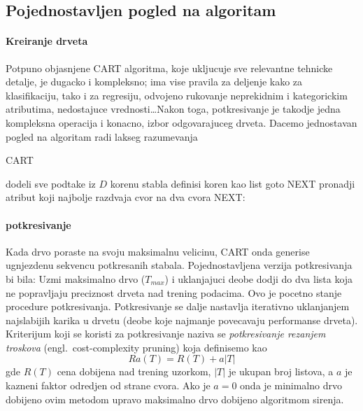 \documentclass[a4paper]{article}
\begin{document}
\subsection{Pojednostavljen pogled na algoritam}

\paragraph{Kreiranje drveta} Potpuno objasnjene CART algoritma, koje ukljucuje sve relevantne
tehnicke detalje, je dugacko i kompleksno; ima vise pravila za deljenje kako za klasifikaciju, tako
i za regresiju, odvojeno rukovanje neprekidnim i kategorickim atributima, nedostajuce
vrednosti\ldots Nakon toga, potkresivanje je takodje jedna kompleksna operacija i konacno, izbor
odgovarajuceg drveta. Dacemo jednostavan pogled na algoritam radi lakseg razumevanja

\begin{algorithm}[H]
    \caption{CART}\label{code:cart}
    \begin{algorithmic}[1]
            \State dodeli sve podtake iz \(D\) korenu stabla
            \State definisi koren kao list
                \State goto NEXT
                \EndIf
                \State pronadji atribut koji najbolje razdvaja cvor na dva cvora
                \State NEXT:
            \EndFor
\EndProcedure
\end{algorithmic}
\end{algorithm}

\paragraph{potkresivanje} Kada drvo poraste na svoju maksimalnu velicinu, CART onda generise
ugnjezdenu sekvencu potkresanih stabala. Pojednostavljena verzija potkresivanja bi bila: Uzmi
maksimalno drvo (\(T_{max}\)) i uklanjajuci deobe dodji do dva lista koja ne popravljaju preciznost
drveta nad trening podacima. Ovo je pocetno stanje procedure potkresivanja. Potkresivanje se dalje
nastavlja iterativno uklanjanjem najslabijih karika u drvetu (deobe koje najmanje povecavaju
performanse drveta). Kriterijum koji se koristi za potkresivanje naziva se \emph{potkresivanje
rezanjem troskova} (engl.\ cost-complexity pruning) koja definisemo kao
\begin{equation}\label{eq:cost-complexity-pruning}
    Ra(T) = R(T) + a|T|
\end{equation}
gde \(R(T)\) cena dobijena nad trening uzorkom, \(|T|\) je ukupan broj listova, a \(a\) je kazneni
faktor odredjen od strane cvora. Ako je \(a = 0\) onda je minimalno drvo dobijeno ovim metodom
upravo maksimalno drvo dobijeno algoritmom sirenja.
\end{document}
